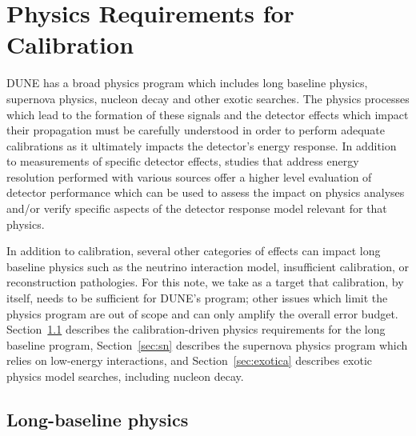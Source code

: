 \section{Physics Requirements for Calibration}
\label{sec:calibphys} %

DUNE has a broad physics program which includes long baseline physics, supernova physics, nucleon decay and other exotic searches. The physics processes which lead to the formation of these signals and the detector effects which impact their propagation must be carefully understood in order to perform adequate calibrations as it ultimately impacts the detector's energy response. In addition to measurements of specific detector effects, studies that address energy resolution performed with various sources offer a higher level evaluation of detector performance which can be used to assess the impact on physics analyses and\slash or verify specific aspects of the detector response model relevant for that physics.

In addition to calibration, several other categories of effects can impact long baseline physics such as the neutrino interaction model, insufficient calibration, or reconstruction pathologies. For this note, we take as a target that calibration, by itself, needs to be sufficient for DUNE's program; other issues which limit the physics program are out of scope and can only amplify the overall error budget. Section~\ref{sec:lbl} describes the calibration-driven physics requirements for the long baseline program, Section~\ref{sec:sn} describes the supernova physics program which relies on low-energy interactions, and Section~\ref{sec:exotica} describes exotic physics model searches, including nucleon decay. 

 
\subsection{Long-baseline physics }\label{sec:lbl}


